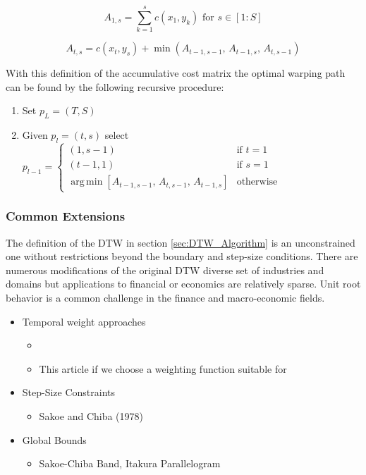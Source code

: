 \documentclass[12pt]{article}
\DeclareMathOperator*{\argmin}{arg\,min}
\begin{document}
\begin{equation}
    A_{1,s} = \sum^{s}_{k=1} c(x_{1}, y_{k}) \,\, \textrm{for} \,\, s \in [1:S]
\end{equation}

\begin{equation}
    A_{t, s} = c(x_{t}, y_{s}) + \min\left(A_{t-1, s-1}, \, A_{t-1, s}, \, A_{t, s-1}\right)
\end{equation}

With this definition of the accumulative cost matrix the optimal warping path can be found by the following recursive procedure:

\begin{enumerate}
    \item Set $p_{L} = (T, S)$
    \item Given $p_{l} = (t, s)$ select $p_{l - 1} = \begin{cases} (1, s-1) & \textrm{if } t=1 \\ (t-1,1) & \textrm{if } s=1 \\ 
                                            \argmin \left[ A_{t-1, s-1},\, A_{t, s-1},\, A_{t-1, s} \right] & \textrm{otherwise} \end{cases}$
\end{enumerate}

\subsubsection{Common Extensions}

The definition of the DTW in section \ref{sec:DTW_Algorithm} is an unconstrained one without restrictions beyond the boundary and step-size conditions. There are numerous modifications of the original DTW diverse set of industries and domains but applications to financial or economics are relatively sparse. Unit root behavior is a common challenge in the finance and macro-economic fields.

\begin{itemize}
    \item Temporal weight approaches
        \begin{itemize}
            \item \parencite{JEONG20112231}
            \item This article if we choose a weighting function suitable for 
        \end{itemize}
    \item Step-Size Constraints
        \begin{itemize}
            \item Sakoe and Chiba (1978)
        \end{itemize}
    \item Global Bounds
        \begin{itemize}
            \item Sakoe-Chiba Band, Itakura Parallelogram
        \end{itemize}
\end{itemize}
\end{document}
